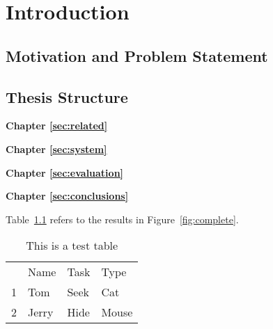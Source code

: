 %
\chapter{Introduction}
\label{sec:intro}

\Blindtext[2][1]

\section{Motivation and Problem Statement}
\label{sec:intro:motivation}

\Blindtext[2][1]

\section{Thesis Structure}
\label{sec:intro:structure}

\textbf{Chapter \ref{sec:related}} \\[0.2em]
\Blindtext[1][1]

\textbf{Chapter \ref{sec:system}} \\[0.2em]
\Blindtext[1][1]

\textbf{Chapter \ref{sec:evaluation}} \\[0.2em]
\Blindtext[1][1]

\textbf{Chapter \ref{sec:conclusions}} \\[0.2em]
\Blindtext[1][1]


Table~\ref{tab:roles} refers to the results in Figure~\ref{fig:complete}.

\begin{table}
  \centering
  \begin{tabular}{llll}
      & Name  & Task  & Type  \\
    1 & Tom   & Seek  & Cat   \\
    2 & Jerry & Hide  & Mouse 
  \end{tabular}
  \caption{This is a test table}
  \label{tab:roles}
\end{table}
